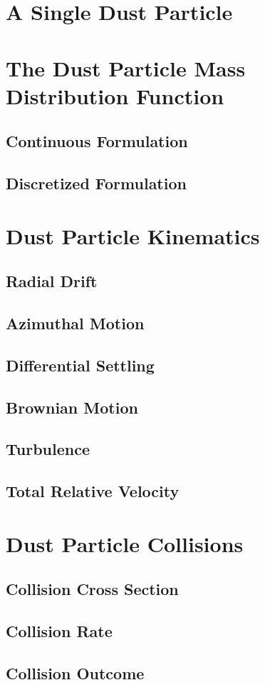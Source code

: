 \section{A Single Dust Particle}
\section{The Dust Particle Mass Distribution Function}
    \subsection{Continuous Formulation}
    \subsection{Discretized Formulation}
\section{Dust Particle Kinematics}
    \subsection{Radial Drift}
    \subsection{Azimuthal Motion}
    \subsection{Differential Settling}
    \subsection{Brownian Motion}
    \subsection{Turbulence}
    \subsection{Total Relative Velocity}
\section{Dust Particle Collisions}
    \subsection{Collision Cross Section}
    \subsection{Collision Rate}
    \subsection{Collision Outcome}
